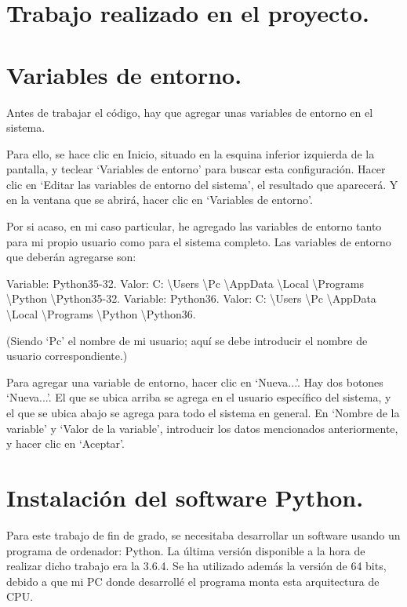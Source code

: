 \documentclass[12pt]{article}
\begin{document}
\section{Trabajo realizado en el proyecto.}

\section{Variables de entorno.}

Antes de trabajar el código, hay que agregar unas variables de entorno en el sistema.

Para ello, se hace clic en Inicio, situado en la esquina inferior izquierda de la pantalla, y teclear ‘Variables de entorno’ para buscar esta configuración. Hacer clic en ‘Editar las variables de entorno del sistema’, el resultado que aparecerá. Y en la ventana que se abrirá, hacer clic en ‘Variables de entorno’.

Por si acaso, en mi caso particular, he agregado las variables de entorno tanto para mi propio usuario como para el sistema completo. Las variables de entorno que deberán agregarse son:

Variable: Python35-32. Valor: C: \textbackslash Users \textbackslash Pc \textbackslash AppData \textbackslash Local \textbackslash Programs \textbackslash Python \textbackslash Python35-32.
Variable: Python36. Valor: C: \textbackslash Users \textbackslash Pc \textbackslash AppData \textbackslash Local \textbackslash Programs \textbackslash Python \textbackslash Python36.

(Siendo ‘Pc’ el nombre de mi usuario; aquí se debe introducir el nombre de usuario correspondiente.)

Para agregar una variable de entorno, hacer clic en ‘Nueva...’. Hay dos botones ‘Nueva...’. El que se ubica arriba se agrega en el usuario específico del sistema, y el que se ubica abajo se agrega para todo el sistema en general. En ‘Nombre de la variable’ y ‘Valor de la variable’, introducir los datos mencionados anteriormente, y hacer clic en ‘Aceptar’.




\section{Instalación del software Python.}

Para este trabajo de fin de grado, se necesitaba desarrollar un software usando un programa de ordenador: Python. La última versión disponible a la hora de realizar dicho trabajo era la 3.6.4. Se ha utilizado además la versión de 64 bits, debido a que mi PC donde desarrollé el programa monta esta arquitectura de CPU.
\end{document}
